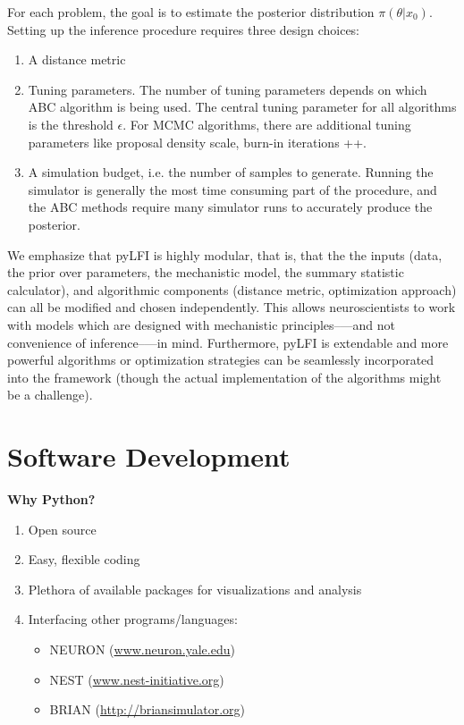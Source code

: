For each problem, the goal is to estimate the posterior distribution $\pi(\theta | x_0)$. Setting up the inference procedure requires three design choices: 
\begin{enumerate}
    \item A distance metric
    \item Tuning parameters. The number of tuning parameters depends on which ABC algorithm is being used. The central tuning parameter for all algorithms is the threshold $\epsilon$. For MCMC algorithms, there are additional tuning parameters like proposal density scale, burn-in iterations ++. 
    \item A simulation budget, i.e. the number of samples to generate. Running the simulator is generally the most time consuming part of the procedure, and the ABC methods require many simulator runs to accurately produce the posterior. 
\end{enumerate}

We emphasize that pyLFI is highly modular, that is, that the the inputs (data, the prior over parameters, the mechanistic model, the summary statistic calculator), and algorithmic components (distance metric, optimization approach) can all be modified and chosen independently. This allows neuroscientists to work with models which are designed with mechanistic principles–—and not convenience of inference–—in mind.
Furthermore, pyLFI is extendable and more powerful algorithms or optimization strategies can be seamlessly incorporated into the framework (though the actual implementation of the algorithms might be a challenge).



\section{Software Development}

\textbf{Why Python?}

\begin{enumerate}
    \item Open source
    \item Easy, flexible coding
    \item Plethora of available packages for visualizations and analysis
    \item Interfacing other programs/languages:
    \begin{itemize}
        \item NEURON (\url{www.neuron.yale.edu})
        \item NEST (\url{www.nest-initiative.org})
        \item BRIAN (\url{http://briansimulator.org})
    \end{itemize}
\end{enumerate}


